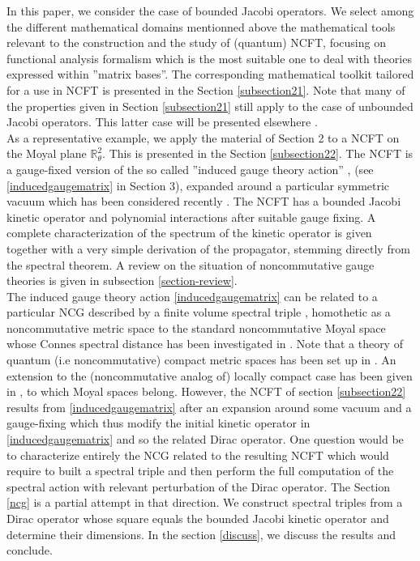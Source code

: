 \documentclass[a4paper]{jpconf}
\numberwithin{equation}{section}
\theoremstyle{nonumberplain}
\begin{document}
In this paper, we consider the case of bounded Jacobi operators. We select among the different mathematical domains mentionned above the mathematical tools relevant to the construction and the study of (quantum) NCFT, focusing on functional analysis formalism which is the most suitable one to deal with theories expressed within ''matrix bases''. The corresponding mathematical toolkit tailored for a use in NCFT is presented in the Section \ref{subsection21}. Note that many of the properties given in Section \ref{subsection21} still apply to the case of unbounded Jacobi operators. This latter case will be presented elsewhere \cite{unboud-jac}. \\
As a representative example, we apply the material of Section 2 to a NCFT on the Moyal plane $\mathbb{R}^2_\theta$. This is presented in the Section \ref{subsection22}. The NCFT is a gauge-fixed version of the so called ''induced gauge theory action'' \cite{GWW}, \cite{GW07} (see \eqref{inducedgaugematrix} in Section 3), expanded around a particular symmetric vacuum \cite{GWW2} which has been considered recently \cite{MVW13}. The NCFT has a bounded Jacobi kinetic operator and polynomial interactions after suitable gauge fixing. A complete characterization of the spectrum of the kinetic operator is given together with a very simple derivation of the propagator, stemming directly from the spectral theorem. A review on the situation of noncommutative gauge theories is given in subsection \ref{section-review}.\\
The induced gauge theory action \eqref{inducedgaugematrix} can be related to a particular NCG described by a finite volume spectral triple \cite{finite-vol}, homothetic as a noncommutative metric space \cite{homot-moyal} to the standard noncommutative Moyal space \cite{marseil1} whose Connes spectral distance has been investigated in \cite{moyal1}. Note that a theory of quantum (i.e noncommutative) compact metric spaces has been set up in \cite{Rieffel}. An extension to the (noncommutative analog of) locally compact case has been given in \cite{latrem}, to which Moyal spaces belong. However, the NCFT of section \ref{subsection22} results from \eqref{inducedgaugematrix} after an expansion around some vacuum and a gauge-fixing which thus modify the initial kinetic operator in \eqref{inducedgaugematrix} and so the related Dirac operator. One question would be to characterize entirely the NCG related to the resulting NCFT which would require to built a spectral triple and then perform the full computation of the 
spectral action with relevant perturbation of the Dirac operator. The Section \ref{ncg} is a partial attempt in that direction. We construct spectral triples from a Dirac operator whose square equals the bounded Jacobi kinetic operator and determine their dimensions. In the section \ref{discuss}, we discuss the results and conclude.\par 
\end{document}
